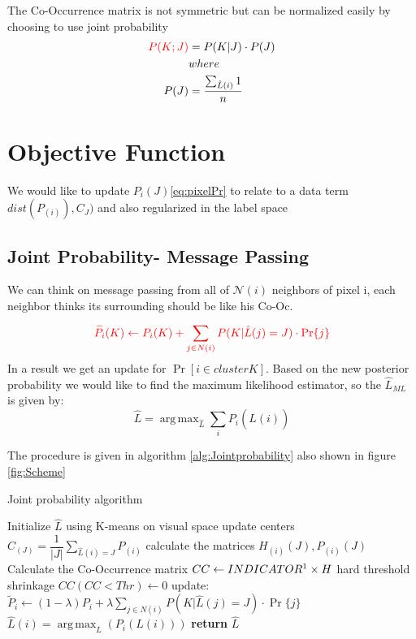 \documentclass{article}
\DeclareMathOperator*{\argmax}{arg\,max}
\begin{document}
The Co-Occurrence matrix is not symmetric but can be normalized easily by choosing to use joint probability 
\begin{align}
\color{red}
P(K;J)&=P(K|J)\cdot P(J) \label{eq:jointprob}\\
&where\nonumber\\
P(J)&=\dfrac{\sum_{\hat{L}(i)}^{}   1}{n} \nonumber
\end{align}

\section{Objective Function}
We would like to update  $ P_{i}(J) $\eqref{eq:pixelPr} to relate to a data term $ dist(P_{(i)} ),C_J) $ and also regularized in the label space

\subsection{Joint Probability- Message Passing}
We can think on message passing from all of $\mathcal{N}(i)$ neighbors of pixel i, each neighbor thinks its surrounding should be like his Co-Oc.
\begin{equation}
\color{red}
\widetilde{P}_i(K) \leftarrow P_i(K) + \sum_{j\in N(i)}^{} P(K|\hat{L}(j)=J)\cdot \Pr\{j\}
\end{equation}
In a result we get an update for $ \Pr [i \in cluster K] $. Based on the new posterior probability we would like to find the maximum likelihood estimator, so the $ \hat{L}_{ML} $ is given by:
$$ \hat{L}=\argmax _{\hat{L}} \sum_{i}^{}P_i(\hat{L}(i)) $$

The procedure is given in algorithm \eqref{alg:Jointprobability} also shown in figure \ref{fig:Scheme}
\newpage

\begin{algorithm}[!h] 
	\caption{Joint probability algorithm}\label{alg:Jointprobability}
	\begin{algorithmic}
		\State Initialize $\hat L$ using K-means on visual space
		\Loop
		\State update centers $C_{(J)}=\dfrac{1}{|J|} \sum_{\hat{L}(i)=J}^{}P_{(i)}$
		\State calculate the matrices $ H_{(i)}(J),P_{(i)}(J) $
		\State Calculate the Co-Occurrence matrix  $ CC\gets INDICATOR\footnotemark\times H $
		\State hard threshold shrinkage $ CC(CC<Thr)\gets 0 $ 
		\State update: $ \widetilde{P}_i \leftarrow (1-\lambda)P_i + \lambda\sum_{j\in N(i)}^{} P(K|\hat{L}(j)=J)\cdot \Pr\{j\} $
		\State $ \hat{L}(i)=\argmax _L(  P_i(L(i))  ) $
		\EndLoop
		\State \textbf{return} $\hat{L}$
		
	\end{algorithmic}
\end{algorithm}
\end{document}
